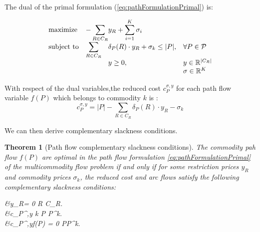 \documentclass[14pt,a4paper]{article}
\newtheorem{theorem}{Theorem}[section]
\theoremstyle{definition}
\numberwithin{equation}{subsection}
\begin{document}
The dual of the primal formulation (\ref{eq:pathFormulationPrimal}) is:

\begin{equation}
\begin{array}{ll@{}ll}
\text{maximize}  & -\displaystyle\sum\limits_{R \in C_R} &y_R  +\displaystyle\sum\limits_{i=1}^{K}\sigma_i &\\
\text{subject to}& \displaystyle\sum\limits_{R \in C_R}   &\delta_P(R)\cdot y_R + \sigma_k \leq |P|,  &\forall P \in \mathcal{P}\\
&                                                &y \geq 0, &y \in \mathbb{R}^{|C_R|} \\
& 												 & &\sigma \in \mathbb{R}^K\\
\end{array}
\label{eq:pathFormulationDual}
\end{equation}




With respect of the dual variables,the reduced cost $c_P^{\sigma,y}$ for each path flow variable $f(P)$ which belongs to commodity $k$ is :
\begin{equation}
 c_P^{\sigma,y} = |P| - \sum\limits_{R \in C_R}   \delta_P(R)\cdot y_R -\sigma_k
\label{eq:reducedCost}
\end{equation}


We can then derive complementary slackness conditions.

\begin{theorem}[Path flow complementary slackness conditions]
	The commodity pah flow $f(P)$ are optimal in the path flow formulation \eqref{eq:pathFormulationPrimal} of the multicommodity flow problem if and only if for some restriction prices $y_R$ and commodity prices $\sigma_k$, the reduced cost and arc flows satisfy the following complementary slackness conditions: 
	\begin{flalign}
	&y_R= 0  R \in C_R. \label{eq:cond1}\\
	&c_P^{\sigma,y}   k \in [K] P \in P^k. \label{eq:cond2}\\
	&c_P^{\sigma,y}\cdot f(P) = 0  \in [K]  P\in P^k. \label{eq:cond3}
	\end{flalign}
	\label{theorem:slackcond}
\end{theorem}
\end{document}
